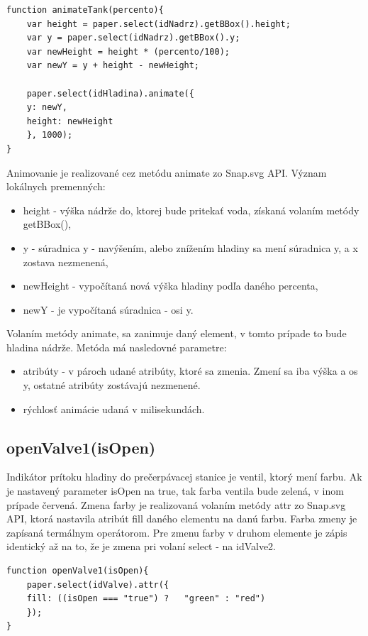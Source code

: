 \begin{lstlisting}[language = HTML]
function animateTank(percento){
	var height = paper.select(idNadrz).getBBox().height;
	var y = paper.select(idNadrz).getBBox().y;
	var newHeight = height * (percento/100);
	var newY = y + height - newHeight;
	
	paper.select(idHladina).animate({
	y: newY,
	height: newHeight
	}, 1000);
}
\end{lstlisting}

Animovanie je realizované cez metódu animate zo Snap.svg API. 
Význam lokálnych premenných: 
\begin{itemize}
	\item height - výška nádrže do, ktorej bude pritekať voda,  získaná volaním metódy getBBox(),
	\item y - súradnica y - navýšením, alebo znížením hladiny sa mení súradnica y, a x zostava nezmenená,
	\item newHeight - vypočítaná nová výška hladiny podľa daného percenta, 
	\item newY - je vypočítaná súradnica - osi y. 
\end{itemize}

Volaním metódy animate, sa zanimuje daný element, v tomto prípade to bude hladina nádrže. Metóda má nasledovné parametre: \begin{itemize}
	\item atribúty - v pároch udané atribúty, ktoré sa zmenia. Zmení sa iba výška a os y, ostatné atribúty zostávajú nezmenené.
	\item rýchlosť animácie udaná v milisekundách. 
\end{itemize}

 
\subsection{openValve1(isOpen)}
Indikátor prítoku hladiny do prečerpávacej stanice je ventil, ktorý mení farbu. Ak je nastavený parameter isOpen na true, tak farba ventila bude zelená, v inom prípade červená. 
Zmena farby je realizovaná volaním metódy attr zo Snap.svg API, ktorá nastavila atribút fill daného elementu na danú farbu. Farba zmeny je zapísaná termálnym operátorom. 
Pre zmenu farby v druhom elemente je zápis identický až na to, že je zmena pri volaní select - na idValve2. 
\begin{lstlisting}
function openValve1(isOpen){
	paper.select(idValve).attr({
	fill: ((isOpen === "true") ?   "green" : "red")
	});
}
\end{lstlisting}



